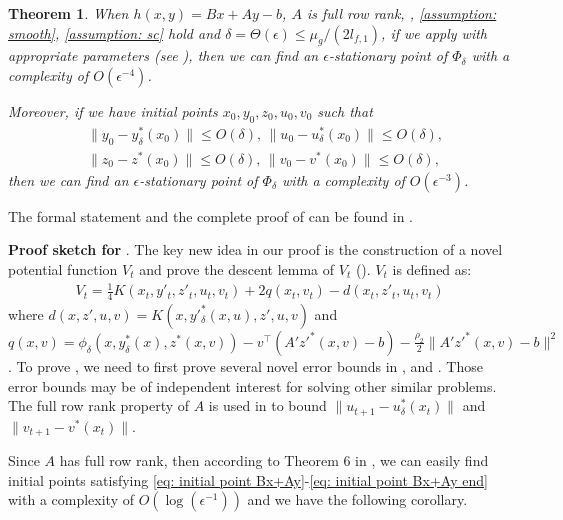 \documentclass{article}
\theoremstyle{plain}
\newtheorem{theorem}{Theorem}[section]
\theoremstyle{definition}
\theoremstyle{remark}
\begin{document}
\begin{theorem}\label{thm: Bx+Ay}
When $h(x,y)=Bx+Ay-b$, $A$ is full row rank, , \ref{assumption: smooth}, \ref{assumption: sc} hold and $\delta=\Theta(\epsilon)\leq \mu_g/(2l_{f,1})$, if we apply  with appropriate parameters (see ), then we can find an $\epsilon$-stationary point of $\Phi_\delta$
with a complexity of $O(\epsilon^{-4})$.

Moreover, if we have initial points $x_0, y_0, z_0, u_0, v_0$ such that
\begin{align}\label{eq: initial point Bx+Ay}
        &\|y_0-y^*_\delta(x_0)\|\leq O(\delta), \, \|u_0-u^*_\delta(x_0)\|\leq O(\delta),\\
        &\|z_0-z^*(x_0)\|\leq O(\delta), \, \|v_0-v^*(x_0)\|\leq O(\delta),\label{eq: initial point Bx+Ay end}
\end{align}
then we can find an $\epsilon$-stationary point of $\Phi_\delta$
with a complexity of $O(\epsilon^{-3})$.
\end{theorem}
The formal statement and the complete proof of  can be found in . 

\textbf{Proof sketch for }.
The key new idea in our proof is the construction of a novel potential function $V_t$ and prove the descent lemma of $V_t$ (). $V_t$ is defined as:
\begin{align*}
    V_t=\frac{1}{4}K(x_t, y'_t, z'_t, u_t, v_t)+2q(x_t,v_t)-d(x_t,z'_t, u_t, v_t)
\end{align*}
where 
$d(x, z', u, v)=K(x, y'^*_\delta(x,u), z', u,v)$ and $q(x, v)=\phi_\delta(x, y^*_\delta(x), z^*(x, v))-v^\top(A'z'^*(x, v)-b)-\frac{\rho_2}{2}\|A'z'^*(x, v)-b\|^2$. To prove , we need to first prove several novel error bounds in ,  and . Those error bounds may be of independent interest for solving other similar problems. The full row rank property of $A$ is used in  to bound $\|u_{t+1}-u^*_\delta(x_t)\|$ and $\|v_{t+1}-v^*(x_t)\|$.



Since $A$ has full row rank, then according to Theorem 6 in \cite{jiang2024primal}, we can easily find initial points satisfying \eqref{eq: initial point Bx+Ay}-\eqref{eq: initial point Bx+Ay end} with a complexity of $O(\log(\epsilon^{-1}))$ and we have the following corollary.
\end{document}
